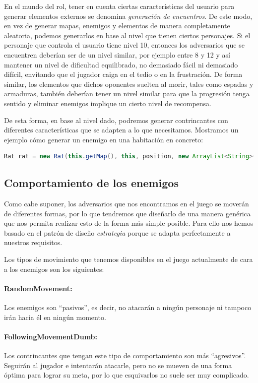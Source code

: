 En el mundo del rol, tener en cuenta ciertas características del usuario para generar elementos externos se denomina \textit{generación de encuentros}. De este modo, en vez de generar mapas, enemigos y elementos de manera completamente aleatoria, podemos generarlos en base al nivel que tienen ciertos personajes. Si el personaje que controla el usuario tiene nivel 10, entonces los adversarios que se encuentren deberían ser de un nivel similar, por ejemplo entre 8 y 12 y así mantener un nivel de dificultad equilibrado, no demasiado fácil ni demasiado difícil, envitando que el jugador caiga en el tedio o en la frustración. De forma similar, los elementos que dichos oponentes suelten al morir, tales como espadas y armaduras, también deberían tener un nivel similar para que la progresión tenga sentido y eliminar enemigos implique un cierto nivel de recompensa.

De esta forma, en base al nivel dado, podremos generar contrincantes con diferentes características que se adapten a lo que necesitamos. Mostramos un ejemplo cómo generar un enemigo en una habitación en concreto:

\begin{lstlisting}[language=java]
Rat rat = new Rat(this.getMap(), this, position, new ArrayList<String>(), level);
\end{lstlisting}

\subsection{Comportamiento de los enemigos}
\label{sec:ia}

Como cabe suponer, los adversarios que nos encontramos en el juego se moverán de diferentes formas, por lo que tendremos que diseñarlo de una manera genérica que nos permita realizar esto de la forma más simple posible.
Para ello nos hemos basado en el patrón de diseño \textit{estrategia} porque se adapta perfectamente a nuestros requisitos.

Los tipos de movimiento que tenemos disponibles en el juego actualmente de cara a los enemigos son los siguientes:

\paragraph{RandomMovement:} Los enemigos son ``pasivos'', es decir, no atacarán a ningún personaje ni tampoco irán hacia él en ningún momento.

\paragraph{FollowingMovementDumb:} Los contrincantes que tengan este tipo de comportamiento son más ``agresivos''. Seguirán al jugador e intentarán atacarle, pero no se mueven de una forma óptima para lograr su meta, por lo que esquivarlos no suele ser muy complicado.


